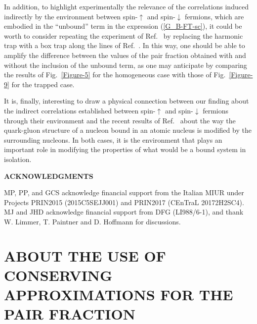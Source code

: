 \documentclass[pra,twocolumn,aps,amssymb,showpacs,superscriptaddress]{revtex4-1}
\begin{document}
In addition, to highlight experimentally the relevance of the correlations induced indirectly by the environment between spin-$\uparrow$ and spin-$\downarrow$ fermions, which are embodied in the ``unbound'' term in the expression (\ref{G_B-FT-sc}), it could be worth to consider repeating the experiment of  Ref.~\cite{Ulm-Cam-2019} by replacing the harmonic trap with a box trap along the lines of Ref.~\cite{Zwierlein-2017}. 
In this way, one should be able to amplify the difference between the values of the pair fraction obtained with and without the inclusion of the unbound term, as one may anticipate by 
comparing the results of Fig.~\ref{Figure-5} for the homogeneous case with those of Fig.~\ref{Figure-9} for the trapped case.

It is, finally, interesting to draw a physical connection between our finding about the indirect correlations established between spin-$\uparrow$ and spin-$\downarrow$ fermions through their environment and the recent results of Ref.~\cite{CLAS-2019} about the way the quark-gluon structure of a nucleon bound in an atomic nucleus is modified by the surrounding nucleons.
In both cases, it is the environment that plays an important role in modifying the properties of what would be a bound system in isolation.




\begin{center}
\begin{small}
{\bf ACKNOWLEDGMENTS}
\end{small}
\end{center}

MP, PP, and GCS acknowledge financial support from the Italian MIUR under Projects PRIN2015 (2015C5SEJJ001) and PRIN2017 (CEnTraL 20172H2SC4).
MJ and JHD acknowledge financial support from DFG (LI988/6-1), and thank W. Limmer, T. Paintner and D. Hoffmann for discussions.



\appendix   

\section{ABOUT THE USE OF CONSERVING APPROXIMATIONS FOR THE PAIR FRACTION}
\label{sec:appendix-conserving}
\end{document}
